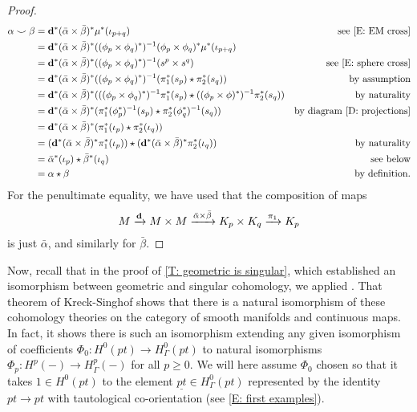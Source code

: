\begin{proof}
\begin{comment}
		Again by \cite[Section 4.3]{Hatc02}, $\mu^*(\iota_{p+q}) = \iota_p \times \iota_q$, so $\alpha\smile \beta = \diag^*(\bar \alpha \times \bar \beta)^*(\iota_p \times \iota_q)$.
		So we compute as follows.
	\end{comment}
	\begin{align*}
		\alpha\smile \beta& = \mathbf{d}^*(\bar \alpha \times \bar \beta)^*\mu^*(\iota_{p+q})&\text{see \eqref{E: EM cross}}\\
		& = \mathbf{d}^*(\bar \alpha \times \bar \beta)^*((\phi_p \times \phi_q)^*)^{-1}(\phi_p \times \phi_q)^*\mu^*(\iota_{p+q})\\
		& = \mathbf{d}^*(\bar \alpha \times \bar \beta)^*((\phi_p \times \phi_q)^*)^{-1}(s^p \times s^q)&\text{see \eqref{E: sphere cross}}\\
		& = \mathbf{d}^*(\bar \alpha \times \bar \beta)^*((\phi_p \times \phi_q)^*)^{-1}(\pi_1^*(s_p) \star \pi_2^*(s_q))&\text{by assumption}\\
		& = \mathbf{d}^*(\bar \alpha \times \bar \beta)^*(((\phi_p \times \phi_q)^*)^{-1}\pi_1^*(s_p) \star ((\phi_p \times \phi)^*)^{-1}\pi_2^*(s_q))&\text{by naturality}\\
		& = \mathbf{d}^*(\bar \alpha \times \bar \beta)^*(\pi_1^*(\phi_p^*)^{-1}(s_p) \star \pi_2^*(\phi_q^*)^{-1}(s_q))&\text{by diagram \eqref{D: projections}}\\
		& = \mathbf{d}^*(\bar \alpha \times \bar \beta)^*(\pi_1^*(\iota_p) \star \pi_2^*(\iota_q))\\
		& = (\mathbf{d}^*(\bar \alpha \times \bar \beta)^*\pi_1^*(\iota_p)) \star (\mathbf{d}^*(\bar \alpha \times \bar \beta)^*\pi_2^*(\iota_q))&\text{by naturality}\\
		& = \bar\alpha^*(\iota_p) \star \bar\beta^*(\iota_q)&\text{see below}\\
		& = \alpha\star\beta &\text{by definition}.
	\end{align*}
	For the penultimate equality, we have used that the composition of maps $$M \xrightarrow{\mathbf{d}}M \times M \xrightarrow{\bar\alpha \times \bar \beta}K_p \times K_q \xrightarrow{\pi_1}K_p$$ is just $\bar \alpha$, and similarly for $\bar \beta$.
\end{proof}


	Now, recall that in the proof of \cref{T: geometric is singular}, which established an isomorphism between geometric and singular cohomology, we applied \cite[Theorem 10]{Krec10b}.
	That theorem of Kreck-Singhof shows that there is a natural isomorphism of these cohomology theories on the category of smooth manifolds and continuous maps.
	In fact, it shows there is such an isomorphism extending any given isomorphism of coefficients $\Phi_0 \colon H^0(pt) \to H^0_\Gamma(pt)$ to natural isomorphisms $\Phi_p \colon H^p(-) \to H^p_\Gamma(-)$ for all $p\geq 0$.
	We will here assume $\Phi_0$ chosen so that it takes $1 \in H^0(pt)$ to the element $\underline{pt} \in H^0_\Gamma(pt)$ represented by the identity $pt \to pt$ with tautological co-orientation (see \cref{E: first examples}).

